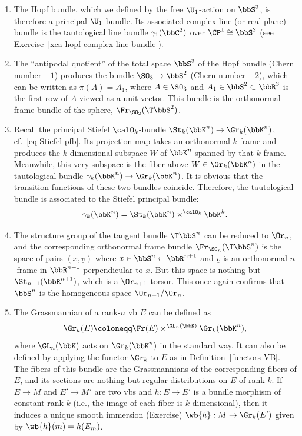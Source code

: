 \begin{example}
\begin{enumerate}
        \item The Hopf bundle, which we defined by the free $\U_1$-action on $\bbS^3$, is therefore a principal $\U_1$-bundle. Its associated complex line (or real plane) bundle is the tautological line bundle $\gamma_1(\bbC^2)$ over $\CP^1\cong\bbS^2$ (see Exercise~\ref{xca hopf complex line bundle}).
        
        \item The ``antipodal quotient'' of the total space $\bbS^3$ of the Hopf bundle (Chern number $-1$) produces the bundle $\SO_3\to \bbS^2$ (Chern number $-2$), which can be written as $\pi(A)=A_1$, where $A\in\SO_3$ and $A_1\in \bbS^2\subset \bbR^3$ is the first row of $A$ viewed as a unit vector. This bundle is the orthonormal frame bundle of the sphere, $\Fr_{\SO_2}(\T\bbS^2)$.
        
        \item Recall the principal Stiefel $\calO_k$-bundle $\St_k(\bbK^n)\to \Gr_k(\bbK^n)$, cf.\ \eqref{eq Stiefel pfb}. Its projection map takes an orthonormal $k$-frame and produces the $k$-dimensional subspace $W$ of $\bbK^n$ spanned by that $k$-frame. Meanwhile, this very subspace is the fiber above $W\in \Gr_k(\bbK^n)$ in the tautological bundle $\gamma_k(\bbK^n)\to \Gr_k(\bbK^n)$. It is obvious that the transition functions of these two bundles coincide. Therefore, the tautological bundle is associated to the Stiefel principal bundle:
        \[\gamma_k(\bbK^n)=\St_k(\bbK^n)\times^{\calO_k}\bbK^k.\]

        \item The structure group of the tangent bundle $\T\bbS^n$ can be reduced to $\Or_n$, and the corresponding orthonormal frame bundle $\Fr_{\SO_n}(\T\bbS^n)$ is the space of pairs $(x,\underline{v})$ where $x\in\bbS^n\subset\bbR^{n+1}$ and $\underline{v}$ is an orthonormal $n$-frame in $\bbR^{n+1}$ perpendicular to $x$. But this space is nothing but $\St_{n+1}(\bbR^{n+1})$, which is a $\Or_{n+1}$-torsor. This once again confirms that $\bbS^n$ is the homogeneous space $\Or_{n+1}\slash \Or_n$.

        \item The Grassmannian of a rank-$n$ \gls{vb} $E$ can be defined as 
        \[\Gr_k(E)\coloneqq \Fr(E)\times^{\GL_n(\bbK)} \Gr_k(\bbK^n),\]
        where $\GL_n(\bbK)$ acts on $\Gr_k(\bbK^n)$ in the standard way. It can also be defined by applying the functor $\Gr_k$ to $E$ as in Definition~\ref{functors VB}. The fibers of this bundle are the Grassmannians of the corresponding fibers of $E$, and its sections are nothing but regular distributions on $E$ of rank $k$.  If $E\to M$ and $E'\to M'$ are two \glspl{vb} and $h:E\to E'$ is a bundle morphism of constant rank $k$ (i.e., the image of each fiber is $k$-dimensional), then it induces a unique smooth immersion (Exercise) $\wb{h}:M\to \Gr_k(E')$ given by $\wb{h}(m)=h(E_m)$.
        

\end{enumerate}
\end{example}
